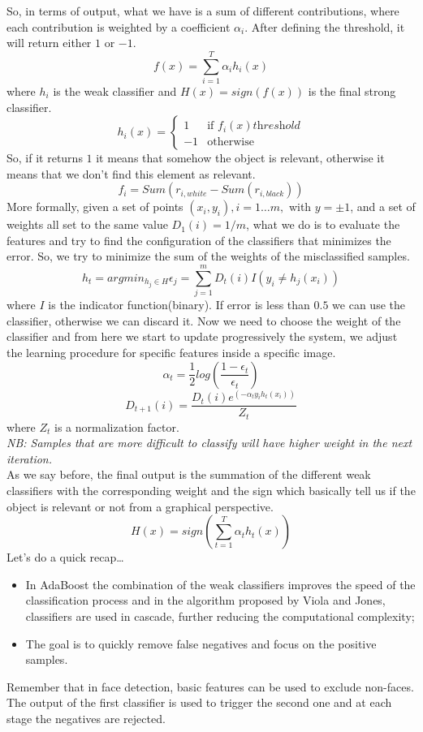 So, in terms of output, what we have is a sum of different contributions, where each contribution is weighted by a coefficient $\alpha_i$.
After defining the threshold, it will return either $1$ or $-1$.
\[
f(x)=\sum_{i=1}^{T}\alpha_ih_i(x)    
\]
where $h_i$ is the weak classifier and $H(x)=sign(f(x))$ is the final strong classifier.
\[h_i(x)=\begin{cases}
    1 & \text{if } f_i(x) \textit{threshold} \\
    -1 & \text{otherwise}
\end{cases}\]
So, if it returns $1$ it means that somehow the object is relevant, otherwise it means that we don't find this element as relevant.
\[f_i = Sum(r_{i, white}-Sum(r_{i, black}))\]
More formally, given a set of points $(x_i,y_i), i=1\dots m,$ with $y = \pm1$, and a set of weights all set to the same value $D_1(i)=1/m$, what we do is to evaluate the features and try to find the configuration of the classifiers that minimizes the error.
So, we try to minimize the sum of the weights of the misclassified samples.
\[h_t = argmin_{h_j \in H} {\epsilon_j}=\sum_{j=1}^{m}D_t(i)I(y_i \neq h_j(x_i))\]
where $I$ is the indicator function(binary).
If error is less than $0.5$ we can use the classifier, otherwise we can discard it.
Now we need to choose the weight of the classifier and from here we start to update progressively the system, we adjust the learning procedure for specific features inside a specific image.
\[\alpha_t = \frac{1}{2}log(\frac{1-\epsilon_t}{\epsilon_t})\]
\[D_{t+1}(i) = \frac{D_t(i)e^{(-\alpha_ty_ih_t(x_i))}}{Z_t}\]
where $Z_t$ is a normalization factor.
\\\textit{NB: Samples that are more difficult to classify will have higher weight in the next iteration.}
\\As we say before, the final output is the summation of the different weak classifiers with the corresponding weight and the sign which basically tell us if the object is relevant or not from a graphical perspective.
\[
H(x)=\textit{sign}(\sum_{t=1}^{T}\alpha_th_t(x))
\]
Let's do a quick recap\dots
\begin{itemize}
    \item In AdaBoost the combination of the weak classifiers improves the speed of the classification process and in the algorithm proposed by Viola and Jones, classifiers are used
in cascade, further reducing the computational complexity;
    \item The goal is to quickly remove false negatives and focus on the positive samples.
\end{itemize}
Remember that in face detection, basic features can be used to exclude non-faces.
The output of the first classifier is used to trigger the second one and at each stage the negatives are rejected.

